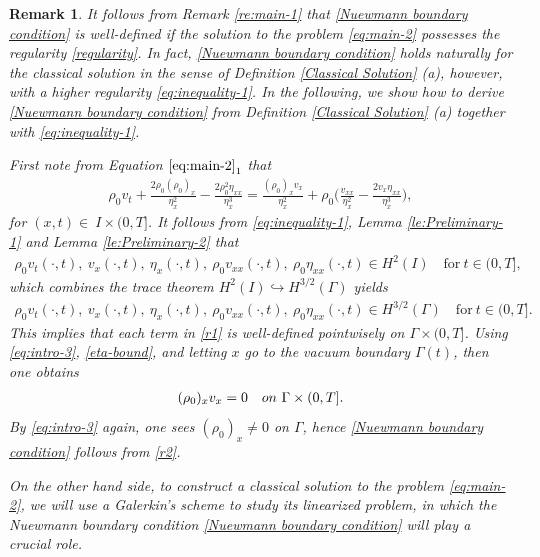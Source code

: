 \documentclass[11pt, reqno]{amsart}
\newtheorem{remark}{Remark}
\numberwithin{equation}{section}
\begin{document}
\begin{remark}\label{re:main-2} It follows  from Remark \ref{re:main-1} that \eqref{Nuewmann boundary condition} is well-defined if the solution to the problem \eqref{eq:main-2} possesses the regularity \eqref{regularity}. In fact, \eqref{Nuewmann boundary condition} holds naturally for the classical solution in the sense of Definition \ref{Classical Solution} (a), however, with a higher regularity \eqref{eq:inequality-1}. In the following, we show how to derive \eqref{Nuewmann boundary condition} from Definition \ref{Classical Solution} (a) together with \eqref{eq:inequality-1}.  

First note from Equation \(\eqref{eq:main-2}_1\) that 
\begin{align}\label{r1}
	\rho_0v_t+{\frac{2\rho_0(\rho_0)_x}{\eta_x^2}}-{\frac{2\rho_0^2\eta_{xx}}{\eta_x^3}}
	=\frac{(\rho_0)_xv_x}{\eta_x^2}+\rho_0\bigg(\frac{v_{xx}}{\eta_x^2}-\frac{2v_x\eta_{xx}}{\eta_x^3}\bigg),
\end{align}
for \((x,t)\in \ I\times (0,T]\). 
It follows from \eqref{eq:inequality-1}, Lemma \ref{le:Preliminary-1} and Lemma \ref{le:Preliminary-2} that
\begin{align*}
	\rho_0v_t(\cdot, t),\ v_x(\cdot, t),\ \eta_x(\cdot, t),\ \rho_0v_{xx}(\cdot, t),\ \rho_0\eta_{xx}(\cdot, t)\in H^2(I)\quad  \text{for}\ t\in (0,T],
\end{align*}
which combines the trace theorem \(H^2(I)\hookrightarrow H^{3/2}(\Gamma)\) yields 
\begin{align*}
	\rho_0v_t(\cdot, t),\ v_x(\cdot, t),\ \eta_x(\cdot, t),\ \rho_0v_{xx}(\cdot, t),\ \rho_0\eta_{xx}(\cdot, t)\in H^{3/2}(\Gamma)\quad  \text{for}\ t\in (0,T].
\end{align*}
This implies that each term in \eqref{r1} is well-defined pointwisely on \( \Gamma\times (0,T]\).
Using \eqref{eq:intro-3}, \eqref{eta-bound}, and  letting \(x\) go to the vacuum boundary \(\Gamma(t)\), then one obtains  
\begin{align}\label{r2}
	(\rho_0)_xv_x=0 \quad \rm{on}\ \Gamma\times (0,T]. 
\end{align}
By \eqref{eq:intro-3} again, one sees \((\rho_0)_x\neq 0\) on \(\Gamma\), hence \eqref{Nuewmann boundary condition} follows from \eqref{r2}.

On the other hand side, to construct a classical solution to the problem \eqref{eq:main-2}, we will use a Galerkin's scheme to study its linearized problem, in which the Nuewmann boundary condition \eqref{Nuewmann boundary condition} will play a crucial role. 

\end{remark}
\end{document}
